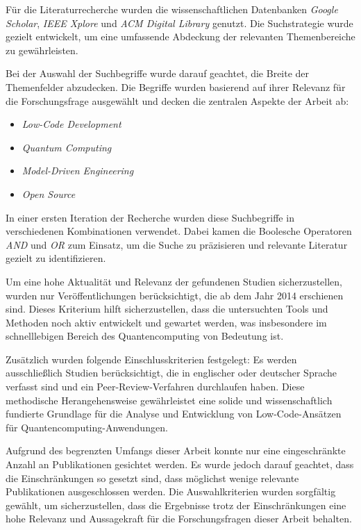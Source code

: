 Für die Literaturrecherche wurden die wissenschaftlichen Datenbanken \textit{Google Scholar}, \textit{IEEE Xplore} und 
\textit{ACM Digital Library} genutzt. Die Suchstrategie wurde gezielt entwickelt, um eine umfassende Abdeckung der relevanten 
Themenbereiche zu gewährleisten.

Bei der Auswahl der Suchbegriffe wurde darauf geachtet, die Breite der Themenfelder abzudecken. Die Begriffe wurden basierend 
auf ihrer Relevanz für die Forschungsfrage ausgewählt und decken die zentralen Aspekte der Arbeit ab:

\begin{itemize}
    \item \textit{Low-Code Development}
    \item \textit{Quantum Computing}
    \item \textit{Model-Driven Engineering}
    \item \textit{Open Source}
\end{itemize}

In einer ersten Iteration der Recherche wurden diese Suchbegriffe in verschiedenen Kombinationen verwendet. 
Dabei kamen die Boolesche Operatoren \textit{AND} und \textit{OR} zum Einsatz, um die Suche zu präzisieren 
und relevante Literatur gezielt zu identifizieren.

Um eine hohe Aktualität und Relevanz der gefundenen Studien sicherzustellen, wurden nur Veröffentlichungen berücksichtigt, 
die ab dem Jahr 2014 erschienen sind. Dieses Kriterium hilft sicherzustellen, dass die untersuchten Tools und Methoden noch 
aktiv entwickelt und gewartet werden, was insbesondere im schnelllebigen Bereich des Quantencomputing von Bedeutung ist.

Zusätzlich wurden folgende Einschlusskriterien festgelegt: Es werden ausschließlich Studien berücksichtigt, die in englischer 
oder deutscher Sprache verfasst sind und ein Peer-Review-Verfahren durchlaufen haben. Diese methodische Herangehensweise 
gewährleistet eine solide und wissenschaftlich fundierte Grundlage für die Analyse und Entwicklung von Low-Code-Ansätzen 
für Quantencomputing-Anwendungen.

Aufgrund des begrenzten Umfangs dieser Arbeit konnte nur eine eingeschränkte Anzahl an Publikationen gesichtet werden. 
Es wurde jedoch darauf geachtet, dass die Einschränkungen so gesetzt sind, dass möglichst wenige relevante Publikationen 
ausgeschlossen werden. Die Auswahlkriterien wurden sorgfältig gewählt, um sicherzustellen, dass die Ergebnisse trotz der 
Einschränkungen eine hohe Relevanz und Aussagekraft für die Forschungsfragen dieser Arbeit behalten.


